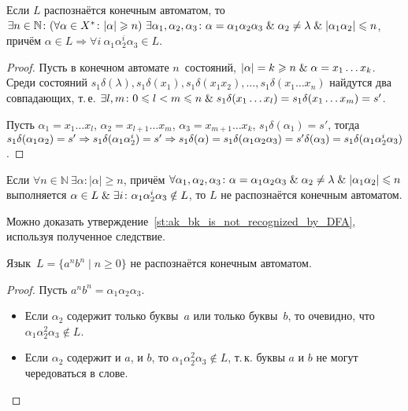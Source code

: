 \begin{lemma}[о накачке]
Если $L$ распознаётся конечным автоматом, то
$\exists n \in \mathbb N \colon (\forall \alpha \in X^* \colon |\alpha| \geqslant n) \ \allowbreak \exists \alpha_1, \alpha_2, \alpha_3 \colon \alpha = \alpha_1 \alpha_2 \alpha_3 \mathrel{\&} \alpha_2 \neq \lambda \mathrel{\&} |\alpha_1 \alpha_2| \leqslant n$,
причём $\alpha \in L \Rightarrow \forall i \ \alpha_1 \alpha_2^i \alpha_3 \in L$.
\end{lemma}
\begin{proof}
Пусть в конечном автомате $n$~состояний, $|\alpha| = k \geqslant n \mathrel{\&} \alpha = x_1 \ldots x_k$.
Среди состояний $s_1 \delta(\lambda), s_1 \delta(x_1), s_1 \delta(x_1 x_2), \ldots, s_1 \delta(x_1 \ldots x_n)$ найдутся два совпадающих, т.\,е.
$\exists l, m \colon 0 \leqslant l < m \leqslant n \lAnd s_1 \delta(x_1 \ldots x_l) \opbr= s_1 \delta(x_1 \ldots x_m) \opbr= s'$.

Пусть $\alpha_1 = x_1 \ldots x_l$, $\alpha_2 = x_{l+1} \ldots x_m$, $\alpha_3 = x_{m+1} \ldots x_k$, $s_1 \delta(\alpha_1) = s'$, тогда $s_1 \delta(\alpha_1 \alpha_2) = s' \opbr\Rightarrow s_1 \delta(\alpha_1 \alpha_2^i) = s' \opbr\Rightarrow s_1 \delta(\alpha) = s_1 \delta(\alpha_1 \alpha_2 \alpha_3) = s' \delta(\alpha_3) = s_1 \delta(\alpha_1 \alpha_2^i \alpha_3)$.
\end{proof}

\begin{consequent}
Если $\forall n \in \mathbb N \ \exists \alpha \colon |\alpha| \geqslant n$,
причём $\forall \alpha_1, \alpha_2, \alpha_3 \colon \alpha = \alpha_1 \alpha_2 \alpha_3 \mathrel{\&} \alpha_2 \neq \lambda \mathrel{\&} |\alpha_1 \alpha_2| \leqslant n$
выполняется $\alpha \in L \mathrel{\&} \exists i \colon \alpha_1 \alpha_2^i \alpha_3 \notin L$,
то $L$ не распознаётся конечным автоматом.
\end{consequent}

Можно доказать утверждение~\ref{st:ak_bk_is_not_recognized_by_DFA}, используя полученное следствие.
\begin{statement}
Язык~$L = \{ a^n b^n \mid n \geqslant 0 \}$ не распознаётся конечным автоматом.
\end{statement}
\begin{proof}
Пусть $a^n b^n = \alpha_1 \alpha_2 \alpha_3$.
\begin{itemize}
	\item Если $\alpha_2$ содержит только буквы~$a$ или только буквы~$b$, то очевидно, что $\alpha_1 \alpha_2^2 \alpha_3 \notin L$.
	\item Если $\alpha_2$ содержит и $a$, и $b$, то $\alpha_1 \alpha_2^2 \alpha_3 \notin L$, т.\,к. буквы $a$ и $b$ не могут чередоваться в слове.
\end{itemize}
\end{proof}

